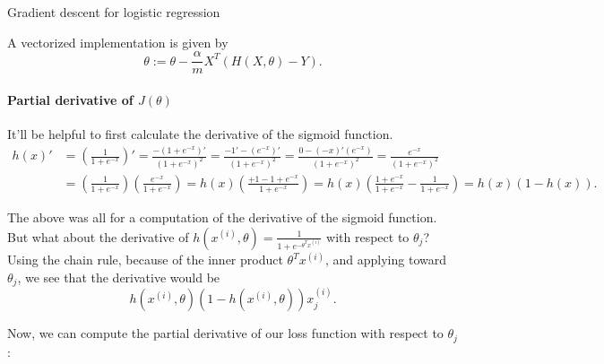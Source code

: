 \documentclass[12pt]{article}
\begin{document}
\begin{algorithm}
  \caption{Gradient descent for logistic regression}
\end{algorithm}

A vectorized implementation is given by
\[
  \theta := \theta - \frac{\alpha}{m} X^T \left(H(X,\theta) - Y\right).
\]

\paragraph{Partial derivative of $J(\theta)$} It'll be helpful to first calculate the derivative of the sigmoid function.
\begin{align*}
  h(x)' &= \left( \frac{1}{1 + e^{-x}} \right)' = \frac{-(1 + e^{-x})'}{(1 + e^{-x})^2} = \frac{-1' - (e^{-x})'}{(1 + e^{-x})^2} = \frac{0 -           (-x)'(e^{-x})}{(1 + e^{-x})^2} = \frac{e^{-x}}{(1 + e^{-x})^2} \\
        &= \left( \frac{1}{1 + e^{-x}} \right) \left( \frac{e^{-x}}{1 + e^{-x}} \right) = h(x) \left( \frac{+1 - 1 + e^{-x}}{1 + e^{-x}} \right) = h(x) \left(\frac{1+e^{-x}}{1+e^{-x}} - \frac{1}{1+e^{-x}}\right) = h(x) (1 - h(x)).
\end{align*}

The above was all for a computation of the derivative of the sigmoid function. But what about the derivative of $h(x^{(i)}, \theta) = \frac{1}{1 + e^{-\theta^T x^{(i)}}}$ with respect to $\theta_j$? Using the chain rule, because of the inner product $\theta^T x^{(i)}$, and applying toward $\theta_j$, we see that the derivative would be
\[
  h(x^{(i)},\theta)\left(1 - h(x^{(i)},\theta)\right) x_j^{(i)}.
\]

Now, we can compute the partial derivative of our loss function with respect to $\theta_j$:
\end{document}
